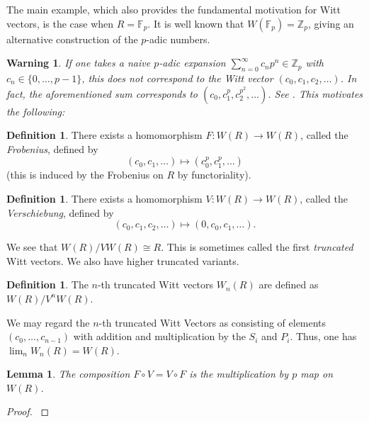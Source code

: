 \documentclass[a4paper]{article}
\newtheorem{lem}[thm]{Lemma}
\newtheorem{warn}[thm]{Warning}
\theoremstyle{definition}
\newtheorem{defn}[thm]{Definition}
\theoremstyle{remark}
\newcommand{\isom}{\cong}
\begin{document}
The main example, which also provides the fundamental motivation
for Witt vectors, is the case when \(R = \mathbb{F}_{p}\).
It is well known that \(W(\mathbb{F}_{p}) = \mathbb{Z}_{p}\), 
giving an alternative construction of the \(p\)-adic numbers.

\begin{warn}
	If one takes a
    naive \(p\)-adic expansion 
    \(\sum_{n = 0}^{\infty} c_{n}p^{n} \in \mathbb{Z}_{p}\)
    with \(c_{n} \in \{0, \ldots, p-1\}\), this does not correspond
    to the Witt vector \((c_{0}, c_{1}, c_{2}, \ldots)\).
    In fact, the aforementioned sum corresponds to 
    \((c_{0}, c_{1}^{p}, c_{2}^{p^{2}}, \ldots)\). See
	\cite[Section~2]{kim-2017-witt-vec}. 
    This motivates the following: 
\end{warn}

\begin{defn}
	There exists a homomorphism \(F \colon W(R) \xrightarrow{} W(R)\),
	called the \textit{Frobenius},
	defined by
	\[
	 (c_{0}, c_{1}, \ldots) \mapsto (c_{0}^{p}, c_{1}^{p}, \ldots)
	\] 
    (this is induced by the Frobenius on \(R\) by functoriality).
\end{defn}

\begin{defn}
	There exists a homomorphism \(V \colon W(R) \xrightarrow{} W(R)\),
	called the \textit{Verschiebung},
	defined by
	\[
		(c_{0}, c_{1}, c_{2}, \ldots) \mapsto  (0, c_{0}, c_{1}, \ldots)
	.\] 
\end{defn}

We see that \(W(R) / VW(R) \isom R\).
This is sometimes called the first \textit{truncated}
Witt vectors.
We also have higher truncated variants.

\begin{defn}
	The \(n\)-th truncated Witt vectors
	\(W_{n}(R)\) are defined as
	\(W(R) / V^{n}W(R)\).
\end{defn}

We may regard the \(n\)-th truncated Witt Vectors as consisting
of elements \((c_{0}, \ldots, c_{n-1})\) with addition
and multiplication by the \(S_{i}\) and \(P_{i}\).
Thus, one has \(\lim_{n} W_{n}(R) = W(R)\).

\begin{lem}
    \label{lem:frob:versch}
	The composition \(F \circ V = V \circ F\) is the multiplication by
	\(p\) map on \(W(R)\).
\end{lem}

\begin{proof}
	\cite[Proposition~5]{kim-2017-witt-vec}
\end{proof}
\end{document}
